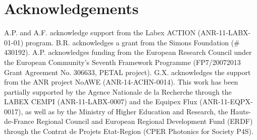 \documentclass[pra,twocolumn,showpacs,preprintnumbers,amsmath,amssymb]{revtex4}
\begin{document}
\section{Acknowledgements}
A.P. and A.F. acknowledge support from the Labex ACTION (ANR-11-LABX-01-01) program. 
B.R. acknowledges a grant from the Simons Foundation (\# 430192).
A.P. acknowledges funding from the European Research Council under the European Community's Seventh Framework Programme (FP7/20072013 Grant Agreement No. 306633, PETAL project). G.X. acknowledges the support from the ANR project NoAWE (ANR-14-ACHN-0014).
This work has been partially supported by the Agence Nationale de la Recherche through the LABEX CEMPI (ANR-11-LABX-0007) and the Equipex Flux (ANR-11-EQPX-0017), as well as by the Ministry of Higher Education and Research, the Hauts-de-France Regional Council and European Regional Development Fund (ERDF) through the Contrat de Projets Etat-Region (CPER Photonics for Society P4S).
\end{document}
